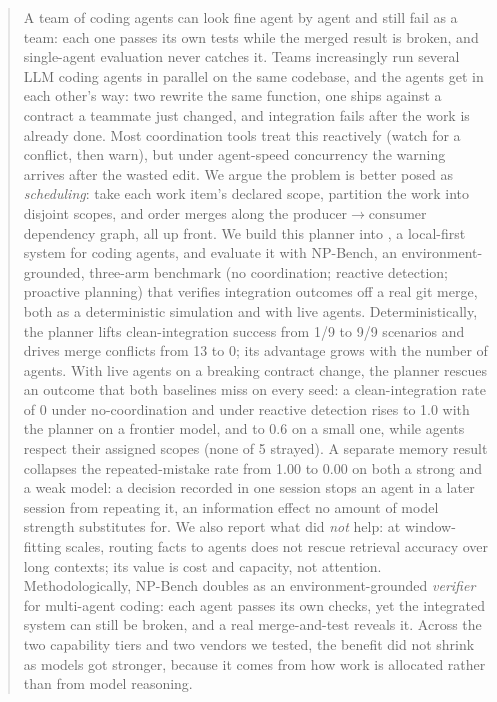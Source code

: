 \begin{abstract}
A team of coding agents can look fine agent by agent and still fail as a team: each one passes its
own tests while the merged result is broken, and single-agent evaluation never catches it.
Teams increasingly run several LLM coding agents in parallel on the same codebase, and the
agents get in each other's way: two rewrite the same function, one ships against a contract a
teammate just changed, and integration fails after the work is already done. Most coordination
tools treat this reactively (watch for a conflict, then warn), but under agent-speed concurrency
the warning arrives after the wasted edit. We argue the problem is better posed as
\emph{scheduling}: take each work item's declared scope, partition the work into disjoint scopes,
and order merges along the producer$\rightarrow$consumer dependency graph, all up front. We build
this planner into \sysname, a local-first system for coding agents, and evaluate it
with NP-Bench, an environment-grounded, three-arm benchmark (no coordination; reactive detection;
proactive planning) that verifies integration outcomes off a real git merge, both as a
deterministic simulation and with live agents. Deterministically, the
planner lifts clean-integration success from 1/9 to 9/9 scenarios and drives merge conflicts from
13 to 0; its advantage grows with the number of agents. With live agents on a breaking contract
change, the planner rescues an outcome that both baselines miss on every seed: a clean-integration
rate of 0 under no-coordination and under reactive detection rises to 1.0 with the planner on a
frontier model, and to 0.6 on a small one, while agents respect their assigned scopes (none of 5
strayed). A separate memory result collapses the
repeated-mistake rate from 1.00 to 0.00 on both a strong and a weak model: a decision recorded in
one session stops an agent in a later session from repeating it, an information effect no
amount of model strength substitutes for. We also report what did \emph{not} help: at
window-fitting scales, routing facts to agents does not rescue retrieval accuracy over long
contexts; its value is cost and capacity, not attention. Methodologically, NP-Bench doubles as an
environment-grounded \emph{verifier} for multi-agent coding: each agent passes its own checks, yet the
integrated system can still be broken, and a real merge-and-test reveals it. Across the two capability
tiers and two vendors we tested, the benefit did not shrink as models got stronger, because it comes
from how work is allocated rather than from model reasoning.
\end{abstract}


